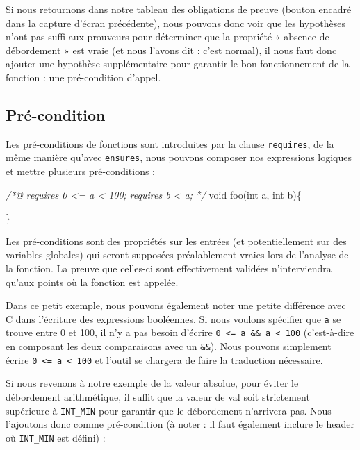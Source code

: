 \documentclass[12pt,francais,]{scrbook}
\newenvironment{Shaded}{}{}
\newcommand{\DataTypeTok}[1]{\textcolor[rgb]{0.56,0.13,0.00}{{#1}}}
\newcommand{\CommentTok}[1]{\textcolor[rgb]{0.38,0.63,0.69}{\textit{{#1}}}}
\newcommand{\NormalTok}[1]{{#1}}
\begin{document}
Si nous retournons dans notre tableau des obligations de preuve (bouton
encadré dans la capture d'écran précédente), nous pouvons donc voir que
les hypothèses n'ont pas suffi aux prouveurs pour déterminer que la
propriété « absence de débordement » est vraie (et nous l'avons dit :
c'est normal), il nous faut donc ajouter une hypothèse supplémentaire
pour garantir le bon fonctionnement de la fonction : une pré-condition
d'appel.

\subsection{Pré-condition}\label{pruxe9-condition}

Les pré-conditions de fonctions sont introduites par la clause
\texttt{requires}, de la même manière qu'avec \texttt{ensures}, nous
pouvons composer nos expressions logiques et mettre plusieurs
pré-conditions :

\begin{footnotesize}\begin{Shaded}
\begin{Highlighting}[]
\CommentTok{/*@}
\CommentTok{  requires 0 <= a < 100;}
\CommentTok{  requires b < a;}
\CommentTok{*/}
\DataTypeTok{void} \NormalTok{foo(}\DataTypeTok{int} \NormalTok{a, }\DataTypeTok{int} \NormalTok{b)\{}
  
\NormalTok{\}}
\end{Highlighting}
\end{Shaded}\end{footnotesize}

Les pré-conditions sont des propriétés sur les entrées (et
potentiellement sur des variables globales) qui seront supposées
préalablement vraies lors de l'analyse de la fonction. La preuve que
celles-ci sont effectivement validées n'interviendra qu'aux points où la
fonction est appelée.

Dans ce petit exemple, nous pouvons également noter une petite
différence avec C dans l'écriture des expressions booléennes. Si nous
voulons spécifier que \texttt{a} se trouve entre 0 et 100, il n'y a pas
besoin d'écrire \texttt{0\ \textless{}=\ a\ \&\&\ a\ \textless{}\ 100}
(c'est-à-dire en composant les deux comparaisons avec un \texttt{\&\&}).
Nous pouvons simplement écrire
\texttt{0\ \textless{}=\ a\ \textless{}\ 100} et l'outil se chargera de
faire la traduction nécessaire.

Si nous revenons à notre exemple de la valeur absolue, pour éviter le
débordement arithmétique, il suffit que la valeur de val soit
strictement supérieure à \texttt{INT\_MIN} pour garantir que le
débordement n'arrivera pas. Nous l'ajoutons donc comme pré-condition (à
noter : il faut également inclure le header où \texttt{INT\_MIN} est
défini) :
\end{document}
